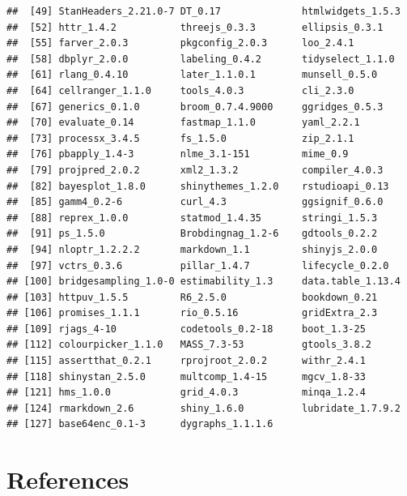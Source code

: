 \documentclass[
  11pt,
  english,
  ,doc,floatsintext]{apa6}
\begin{document}
\begin{verbatim}
##  [49] StanHeaders_2.21.0-7 DT_0.17              htmlwidgets_1.5.3   
##  [52] httr_1.4.2           threejs_0.3.3        ellipsis_0.3.1      
##  [55] farver_2.0.3         pkgconfig_2.0.3      loo_2.4.1           
##  [58] dbplyr_2.0.0         labeling_0.4.2       tidyselect_1.1.0    
##  [61] rlang_0.4.10         later_1.1.0.1        munsell_0.5.0       
##  [64] cellranger_1.1.0     tools_4.0.3          cli_2.3.0           
##  [67] generics_0.1.0       broom_0.7.4.9000     ggridges_0.5.3      
##  [70] evaluate_0.14        fastmap_1.1.0        yaml_2.2.1          
##  [73] processx_3.4.5       fs_1.5.0             zip_2.1.1           
##  [76] pbapply_1.4-3        nlme_3.1-151         mime_0.9            
##  [79] projpred_2.0.2       xml2_1.3.2           compiler_4.0.3      
##  [82] bayesplot_1.8.0      shinythemes_1.2.0    rstudioapi_0.13     
##  [85] gamm4_0.2-6          curl_4.3             ggsignif_0.6.0      
##  [88] reprex_1.0.0         statmod_1.4.35       stringi_1.5.3       
##  [91] ps_1.5.0             Brobdingnag_1.2-6    gdtools_0.2.2       
##  [94] nloptr_1.2.2.2       markdown_1.1         shinyjs_2.0.0       
##  [97] vctrs_0.3.6          pillar_1.4.7         lifecycle_0.2.0     
## [100] bridgesampling_1.0-0 estimability_1.3     data.table_1.13.4   
## [103] httpuv_1.5.5         R6_2.5.0             bookdown_0.21       
## [106] promises_1.1.1       rio_0.5.16           gridExtra_2.3       
## [109] rjags_4-10           codetools_0.2-18     boot_1.3-25         
## [112] colourpicker_1.1.0   MASS_7.3-53          gtools_3.8.2        
## [115] assertthat_0.2.1     rprojroot_2.0.2      withr_2.4.1         
## [118] shinystan_2.5.0      multcomp_1.4-15      mgcv_1.8-33         
## [121] hms_1.0.0            grid_4.0.3           minqa_1.2.4         
## [124] rmarkdown_2.6        shiny_1.6.0          lubridate_1.7.9.2   
## [127] base64enc_0.1-3      dygraphs_1.1.1.6
\end{verbatim}

\newpage

\hypertarget{references}{%
\section*{References}\label{references}}
\end{document}
